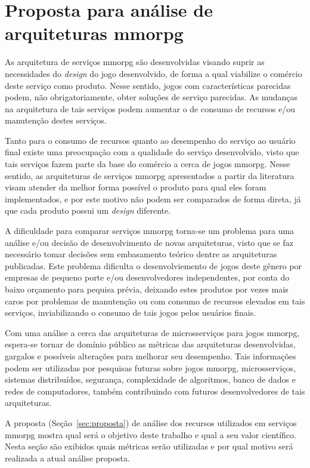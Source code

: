 \chapter{Proposta para análise de arquiteturas \ac{mmorpg}}
\label{cap3}

As arquitetura de serviços \ac{mmorpg} são desenvolvidas visando suprir as necessidades do \textit{design} do jogo desenvolvido, de forma a qual viabilize o comércio deste serviço como produto.
%
Nesse sentido, jogos com características parecidas podem, não obrigatoriamente, obter soluções de serviço parecidas.
%
As mudanças na arquitetura de tais serviços podem aumentar o de consumo de recursos e/ou manutenção destes serviços.


Tanto para o consumo de recursos quanto ao desempenho do serviço ao usuário final existe uma preocupação com a qualidade do serviço desenvolvido, visto que tais serviços fazem parte da base do comércio a cerca de jogos \ac{mmorpg}.
%
Nesse sentido, as arquiteturas de serviços \ac{mmorpg} apresentados a partir da literatura visam atender da melhor forma possível o produto para qual eles foram implementados, e por este motivo não podem ser comparados de forma direta, já que cada produto possui um \textit{design} diferente.


A dificuldade para comparar serviços \ac{mmorpg} torna-se um problema para uma análise e/ou decisão de desenvolvimento de novas arquiteturas, visto que se faz necessário tomar decisões sem embasamento teórico dentre as arquiteturas publicadas.
%
Este problema dificulta o desenvolviemento de jogos deste gênero por empresas de pequeno porte e/ou desenvolvedores independentes, por conta do baixo orçamento para pequisa prévia, deixando estes produtos por vezes mais caros por problemas de manutenção ou com consumo de recursos elevados em tais serviços, inviabilizando o consumo de tais jogos pelos usuários finais.



Com uma análise a cerca das arquiteturas de microsserviços para jogos \ac{mmorpg}, espera-se tornar de domínio público as métricas das arquiteturas desenvolvidas, gargalos e possíveis alterações para melhorar seu desempenho.
%
Tais informações podem ser utilizadas por pesquisas futuras sobre jogos \ac{mmorpg}, microsserviços, sistemas distribuídos, segurança, complexidade de algoritmos, banco de dados e redes de computadores, também contribuindo com futuros desenvolvedores de tais arquiteturas.


A proposta (Seção~\ref{sec:proposta}) de análise dos recursos utilizados em serviços \ac{mmorpg} mostra qual será o objetivo deste trabalho e qual a seu valor científico.
%
Nesta seção são exibidos quais métricas serão utilizadas e por qual motivo será realizada a atual análise proposta.



